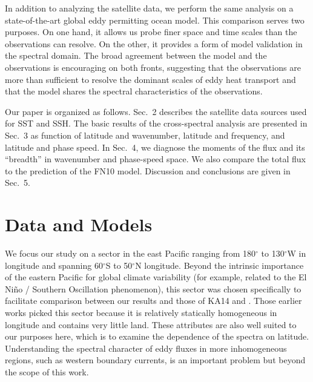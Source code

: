 \documentclass[10pt]{article}
\begin{document}
In addition to analyzing the satellite data, we perform the same analysis on a state-of-the-art global eddy permitting ocean model. This comparison serves two purposes. On one hand, it allows us probe finer space and time scales than the observations can resolve. On the other, it provides a form of model validation in the spectral domain. The broad agreement between the model and the observations is encouraging on both fronts, suggesting that the observations are more than sufficient to resolve the dominant scales of eddy heat transport and that the model shares the spectral characteristics of the observations.


Our paper is organized as follows. Sec.~2 describes the satellite data sources used for SST and SSH. The basic results of the cross-spectral analysis are presented in Sec.~3 as function of latitude and wavenumber, latitude and frequency, and latitude and phase speed. In Sec.~4, we diagnose the moments of the flux and its ``breadth'' in wavenumber and phase-speed space. We also compare the total flux to the prediction of the FN10 model. Discussion and conclusions are given in Sec.~5.

\section{Data and Models}

We focus our study on a sector in the east Pacific ranging from 180$^\circ$ to 130$^\circ$W in longitude and spanning 60$^\circ$S to 50$^\circ$N longitude. Beyond the intrinsic importance of the eastern Pacific for global climate variability (for example, related to the El Ni\~no / Southern Oscillation phenomenon), this sector was chosen specifically to facilitate comparison between our results and those of KA14 and \citet{AbernatheyMarshall2013}. Those earlier works picked this sector because it is relatively statically homogeneous in longitude and contains very little land. These attributes are also well suited to our purposes here, which is to examine the dependence of the spectra on latitude. Understanding the spectral character of eddy fluxes in more inhomogeneous regions, such as western boundary currents, is an important problem but beyond the scope of this work.
\end{document}
